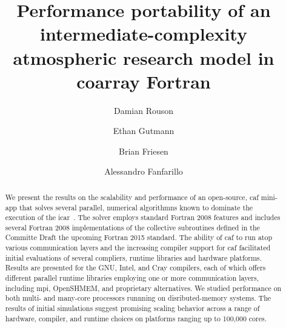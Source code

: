 \documentclass[sigconf, authordraft]{acmart}
\begin{document}
\title{Performance portability of an intermediate-complexity atmospheric research model in coarray Fortran}

\author{Damian Rouson}
\renewcommand{\shortauthors}{D. Rouson et al.}

\author{Ethan Gutmann}

\author{Brian Friesen}

\author{Alessandro Fanfarillo}

\begin{abstract}
We present the results on the scalability and performance of an open-source, \gls{caf} \gls{mini-app} that solves
several parallel, numerical algorithmns known to dominate the execution of the \gls{icar}~\cite{gutmann2016intermediate}.
The solver employs standard Fortran 2008 features and includes several Fortran 2008 implementations of the collective
subroutines defined in the Committe Draft the upcoming Fortran 2015 standard.  The ability of \gls{caf} to run atop various
communication layers and the increasing compiler support for \gls{caf} facilitated initial evaluations of several compliers,
runtime libraries and hardware platforms.  Results are presented for the GNU, Intel, and Cray compilers, each of which offers
different parallel runtime libraries employing one or more communication layers, including \gls{mpi}, OpenSHMEM, and proprietary
alternatives.  We studied performance on both multi- and many-core processors runnning on disributed-memory systems.  The
results of initial simulations suggest promising scaling behavior across a range of hardware, compiler, and runtime choices
on platforms ranging up to 100,000 cores.
\end{abstract}
\end{document}
